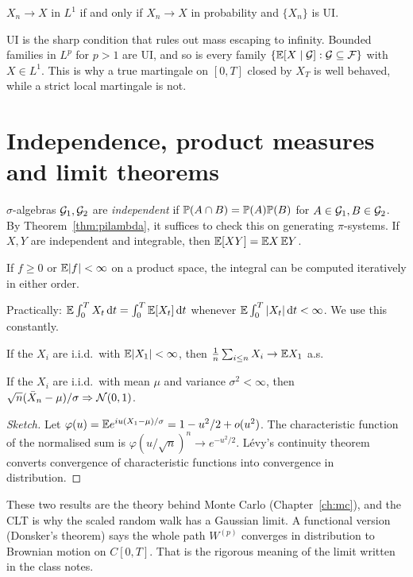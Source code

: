 \begin{theorem}[Vitali]\label{thm:vitali}
$X_n\to X$ in $L^1$ if and only if $X_n\to X$ in probability and $\{X_n\}$ is UI.
\end{theorem}

UI is the sharp condition that rules out mass escaping to infinity. Bounded families in $L^p$ for $p>1$ are UI, and so is every family $\{\mathbb{E}[X\mid\mathcal{G}]:\mathcal{G}\subseteq\mathcal{F}\}$ with $X\in L^1$. This is why a true martingale on $[0,T]$ closed by $X_T$ is well behaved, while a strict local martingale is not.

\section{Independence, product measures and limit theorems}

$\sigma$-algebras $\mathcal{G}_1,\mathcal{G}_2$ are \emph{independent} if $\mathbb{P}(A\cap B)=\mathbb{P}(A)\mathbb{P}(B)$ for $A\in\mathcal{G}_1,B\in\mathcal{G}_2$. By Theorem~\ref{thm:pilambda}, it suffices to check this on generating $\pi$-systems. If $X,Y$ are independent and integrable, then $\mathbb{E}[XY]=\mathbb{E} X\,\mathbb{E} Y$.

\begin{theorem}
If $f\ge0$ or $\mathbb{E}|f|<\infty$ on a product space, the integral can be computed iteratively in either order.
\end{theorem}

Practically: $\mathbb{E}\int_0^T X_t\,\mathrm{d} t=\int_0^T\mathbb{E}[X_t]\,\mathrm{d} t$ whenever $\mathbb{E}\int_0^T|X_t|\,\mathrm{d} t<\infty$. We use this constantly.

\begin{theorem}
If the $X_i$ are i.i.d.\ with $\mathbb{E}|X_1|<\infty$, then $\frac1n\sum_{i\le n}X_i\to\mathbb{E} X_1$ a.s.
\end{theorem}

\begin{theorem}
If the $X_i$ are i.i.d.\ with mean $\mu$ and variance $\sigma^2<\infty$, then $\sqrt n(\bar X_n-\mu)/\sigma\Rightarrow\mathcal{N}(0,1)$.
\end{theorem}
\begin{proof}[Sketch]
Let $\varphi(u)=\mathbb{E} e^{iu(X_1-\mu)/\sigma}=1-u^2/2+o(u^2)$. The characteristic function of the normalised sum is $\varphi(u/\sqrt n)^n\to e^{-u^2/2}$. L\'evy's continuity theorem converts convergence of characteristic functions into convergence in distribution.
\end{proof}

These two results are the theory behind Monte Carlo (Chapter~\ref{ch:mc}), and the CLT is why the scaled random walk has a Gaussian limit. A functional version (Donsker's theorem) says the whole path $W^{(p)}$ converges in distribution to Brownian motion on $C[0,T]$. That is the rigorous meaning of the limit written in the class notes.

